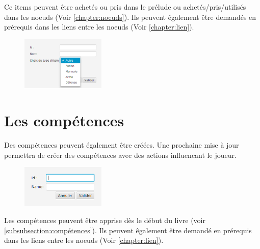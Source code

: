 		Ce items peuvent être achetés ou pris dans le prélude ou achetés/pris/utilisés dans les noeuds (Voir \ref{chapter:noeuds}). Ils peuvent êgalement être demandés en prérequis dans les liens entre les noeuds (Voir \ref{chapter:lien}).
	\begin{figure}[H]
		\centering\includegraphics[width=4cm]{img/inclusItems.png}
	\end{figure}

	\section{Les compétences}
		Des compétences peuvent également être créées. Une prochaine mise à jour permettra de créer des compétences avec des actions influencant le joueur.
		\begin{figure}[H]
			\centering\includegraphics[width=4cm]{img/inclusSkills.png}
		\end{figure}

		Les compétences peuvent être apprise dès le début du livre (voir \ref{subsubsection:compétences}). Ils peuvent êgalement être demandé en prérequis dans les liens entre les noeuds (Voir \ref{chapter:lien}).
